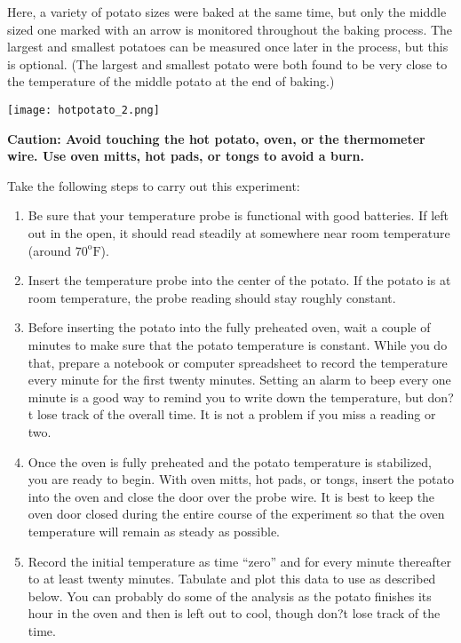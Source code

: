 \documentclass{ximera}
\begin{document}
Here, a variety of potato sizes were baked at the same time, but only the middle sized one marked with an arrow is monitored throughout the baking process.  The largest and smallest potatoes can be measured once later in the process, but this is optional.  (The largest and smallest potato were both found to be very close to the temperature of the middle potato at the end of baking.)

\begin{image}
\texttt{[image: hotpotato\_2.png]}
\end{image}

\textbf{Caution: Avoid touching the hot potato, oven, or the thermometer wire.  Use oven mitts, hot pads, or tongs to avoid a burn.}

Take the following steps to carry out this experiment:
\begin{enumerate}
\item Be sure that your temperature probe is functional with good batteries.  If left out in the open, it should read steadily at somewhere near room temperature (around $70^{\text{o}}\text{F}$).
\item Insert the temperature probe into the center of the potato.  If the potato is at room temperature, the probe reading should stay roughly constant.  
\item Before inserting the potato into the fully preheated oven, wait a couple of minutes to make sure that the potato temperature is constant.  While you do that, prepare a notebook or computer spreadsheet to record the temperature every minute for the first twenty minutes.  Setting an alarm to beep every one minute is a good way to remind you to write down the temperature, but don?t lose track of the overall time.  It is not a problem if you miss a reading or two.
\item Once the oven is fully preheated and the potato temperature is stabilized, you are ready to begin.  With oven mitts, hot pads, or tongs, insert the potato into the oven and close the door over the probe wire.  It is best to keep the oven door closed during the entire course of the experiment so that the oven temperature will remain as steady as possible.
\item Record the initial temperature as time ``zero'' and for every minute thereafter to at least twenty minutes.  Tabulate and plot this data to use as described below.  You can probably do some of the analysis as the potato finishes its hour in the oven and then is left out to cool, though don?t lose track of the time.

\end{enumerate}
\end{document}
